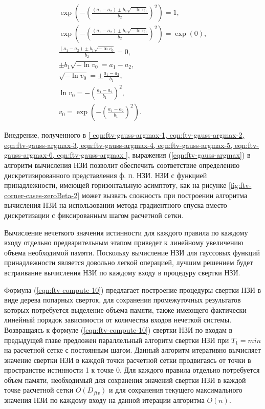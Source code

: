 \begin{gather}
	\exp\left(-\left(\frac{(a_1-a_2)\pm b_1\sqrt{-\ln v_0}}{b_2}\right)^2\right) = 1, \label{eqn:ftv-gauss-argmax-1} \\
	\exp\left(-\left(\frac{(a_1-a_2)\pm b_1\sqrt{-\ln v_0}}{b_2}\right)^2\right) = \exp(0), \label{eqn:ftv-gauss-argmax-2} \\
	\frac{(a_1-a_2)\pm b_1\sqrt{-\ln v_0}}{b_2} = 0, \label{eqn:ftv-gauss-argmax-3} \\
	\pm b_1\sqrt{-\ln v_0} = a_1-a_2, \label{eqn:ftv-gauss-argmax-4} \\
	\sqrt{-\ln v_0} = \pm\frac{a_1-a_2}{b_1}, \label{eqn:ftv-gauss-argmax-5} \\
	\ln v_0 = -\left(\frac{a_1-a_2}{b_1}\right)^2, \label{eqn:ftv-gauss-argmax-6} \\
	v_0 = \exp\left(-\left(\frac{a_1-a_2}{b_1}\right)^2\right). \label{eqn:ftv-gauss-argmax}
\end{gather}

Внедрение, полученного в \cref{
eqn:ftv-gauss-argmax-1,
eqn:ftv-gauss-argmax-2,
eqn:ftv-gauss-argmax-3,
eqn:ftv-gauss-argmax-4,
eqn:ftv-gauss-argmax-5,
eqn:ftv-gauss-argmax-6,
eqn:ftv-gauss-argmax
}, выражения (\ref{eqn:ftv-gauss-argmax}) в алгоритм вычисления НЗИ позволит обеспечить соответствие определению дискретизированного представления ф. п. НЗИ.  НЗИ с функцией принадлежности, имеющей горизонтальную асимптоту, как на рисунке \cref{fig:ftv-corner-cases-zeroBeta-2} может вызвать сложность при построении алгоритма вычисления НЗИ на использовании метода градиентного спуска вместо дискретизации с фиксированным шагом расчетной сетки.

Вычисление нечеткого значения истинности для каждого правила по каждому входу отдельно предварительным этапом приведет к линейному увеличению объема необходимой памяти. Поскольку вычисление НЗИ для гауссовых функций принадлежности является довольно легкой операцией, лучшим решением будет встраивание вычисления НЗИ по каждому входу в процедуру свертки НЗИ.

Формула (\ref{eqn:ftv-compute-10}) предлагает построение процедуры свертки НЗИ в виде дерева попарных сверток, для сохранения промежуточных результатов которых потребуется выделение объема памяти, также имеющего фактически линейный порядок зависимости от количества входов нечеткой системы. Возвращаясь к формуле (\ref{eqn:ftv-compute-10}) свертки НЗИ по входам в предыдущей главе предложен параллельный алгоритм свертки НЗИ при $T_1 = min$ на расчетной сетке с постоянным шагом. Данный алгоритм итеративно вычисляет значение свертки НЗИ в каждой точки расчетной сетки продвигаясь от точки в пространстве истинности 1 к точке 0. Для каждого правила отдельно потребуется объем памяти, необходимый для сохранения значений свертки НЗИ в каждой точке расчетной сетки $O(D_{ftv})$ и для сохранения текущего максимального значения НЗИ по каждому входу на данной итерации алгоритма $O(n)$.

